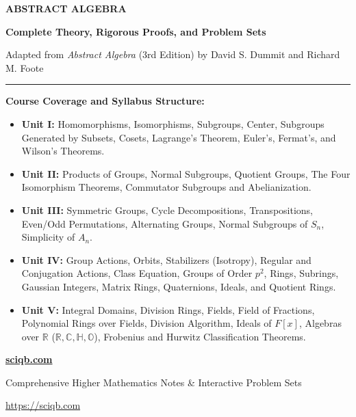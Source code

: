\documentclass[11pt,a4paper,oneside]{book}
\theoremstyle{plain}
\theoremstyle{definition}
\theoremstyle{remark}
\newcommand{\R}{\mathbb{R}}
\newcommand{\C}{\mathbb{C}}
\newcommand{\Hbb}{\mathbb{H}}
\newcommand{\Obb}{\mathbb{O}}
\begin{document}
\frontmatter

\begin{titlepage}
    \centering
    \vspace*{1.5cm}
    {\Huge\bfseries\color{primaryblue} ABSTRACT ALGEBRA \par}
    \vspace{0.6cm}
    {\LARGE\bfseries\color{accentteal} Complete Theory, Rigorous Proofs, and Problem Sets \par}
    \vspace{0.4cm}
    {\large Adapted from \emph{Abstract Algebra} (3rd Edition) by David S. Dummit and Richard M. Foote \par}
    
    \vspace{1.5cm}
    \rule{0.8\textwidth}{1.5pt}
    \vspace{1.2cm}
    
    \begin{minipage}{0.88\textwidth}
        \textbf{Course Coverage and Syllabus Structure:}
        \begin{itemize}[leftmargin=1.5em, itemsep=5pt]
            \item \textbf{Unit I:} Homomorphisms, Isomorphisms, Subgroups, Center, Subgroups Generated by Subsets, Cosets, Lagrange's Theorem, Euler's, Fermat's, and Wilson's Theorems.
            \item \textbf{Unit II:} Products of Groups, Normal Subgroups, Quotient Groups, The Four Isomorphism Theorems, Commutator Subgroups and Abelianization.
            \item \textbf{Unit III:} Symmetric Groups, Cycle Decompositions, Transpositions, Even/Odd Permutations, Alternating Groups, Normal Subgroups of $S_n$, Simplicity of $A_n$.
            \item \textbf{Unit IV:} Group Actions, Orbits, Stabilizers (Isotropy), Regular and Conjugation Actions, Class Equation, Groups of Order $p^2$, Rings, Subrings, Gaussian Integers, Matrix Rings, Quaternions, Ideals, and Quotient Rings.
            \item \textbf{Unit V:} Integral Domains, Division Rings, Fields, Field of Fractions, Polynomial Rings over Fields, Division Algorithm, Ideals of $F[x]$, Algebras over $\R$ ($\R, \C, \Hbb, \Obb$), Frobenius and Hurwitz Classification Theorems.
        \end{itemize}
    \end{minipage}
    
    \vfill
    {\Large\bfseries\color{primaryblue}\href{https://sciqb.com}{sciqb.com}}\par
    \vspace{0.2cm}
    {\normalsize\color{darkgray} Comprehensive Higher Mathematics Notes \& Interactive Problem Sets \par}
    \vspace{0.15cm}
    {\small\color{accentteal}\url{https://sciqb.com}\par}
    \vspace{0.8cm}
\end{titlepage}
\end{document}
